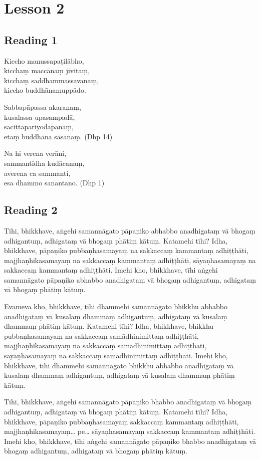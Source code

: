\chapter{Lesson 2}

\section*{Reading 1}

Kiccho manussapaṭilābho,\\
kicchaṃ maccānaṃ jīvitaṃ,\\
kicchaṃ saddhammassavanaṃ,\\
kiccho buddhānamuppādo.

Sabbapāpassa akaraṇaṃ,\\
kusalassa upasampadā,\\
sacittapariyodapanaṃ,\\
etaṃ buddhāna sāsanaṃ. \hfill(Dhp 14)

Na hi verena verāni,\\
sammantīdha kudācanaṃ,\\
averena ca sammanti,\\
esa dhammo sanantano. \hfill(Dhp 1)

\section*{Reading 2}

Tīhi, bhikkhave, aṅgehi samannāgato pāpaṇiko abhabbo anadhigataṃ vā bhogaṃ adhigantuṃ, adhigataṃ vā bhogaṃ phātiṃ kātuṃ. Katamehi tīhi? Idha, bhikkhave, pāpaṇiko pubbaṇhasamayaṃ na sakkaccaṃ kammantaṃ adhiṭṭhāti, majjhaṇhikasamayaṃ na sakkaccaṃ kammantaṃ adhiṭṭhāti, sāyaṇhasamayaṃ na sakkaccaṃ kammantaṃ adhiṭṭhāti. Imehi kho, bhikkhave, tīhi aṅgehi samannāgato pāpaṇiko abhabbo anadhigataṃ vā bhogaṃ adhigantuṃ, adhigataṃ vā bhogaṃ phātiṃ kātuṃ.

Evameva kho, bhikkhave, tīhi dhammehi samannāgato bhikkhu abhabbo anadhigataṃ vā kusalaṃ dhammaṃ adhigantuṃ, adhigataṃ vā kusalaṃ dhammaṃ phātiṃ kātuṃ. Katamehi tīhi? Idha, bhikkhave, bhikkhu pubbaṇhasamayaṃ na sakkaccaṃ samādhinimittaṃ adhiṭṭhāti, majjhaṇhikasamayaṃ na sakkaccaṃ samādhinimittaṃ adhiṭṭhāti, sāyaṇhasamayaṃ na sakkaccaṃ samādhinimittaṃ adhiṭṭhāti. Imehi kho, bhikkhave, tīhi dhammehi samannāgato bhikkhu abhabbo anadhigataṃ vā kusalaṃ dhammaṃ adhigantuṃ, adhigataṃ vā kusalaṃ dhammaṃ phātiṃ kātuṃ.

Tīhi, bhikkhave, aṅgehi samannāgato pāpaṇiko bhabbo anadhigataṃ vā bhogaṃ adhigantuṃ, adhigataṃ vā bhogaṃ phātiṃ kātuṃ. Katamehi tīhi? Idha, bhikkhave, pāpaṇiko pubbaṇhasamayaṃ sakkaccaṃ kammantaṃ adhiṭṭhāti, majjhaṇhikasamayaṃ… pe… sāyaṇhasamayaṃ sakkaccaṃ kammantaṃ adhiṭṭhāti. Imehi kho, bhikkhave, tīhi aṅgehi samannāgato pāpaṇiko bhabbo anadhigataṃ vā bhogaṃ adhigantuṃ, adhigataṃ vā bhogaṃ phātiṃ kātuṃ.

